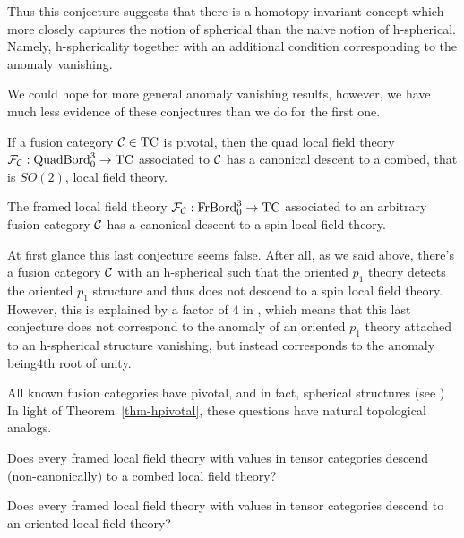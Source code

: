 \documentclass{amsart}
\begin{document}
Thus this conjecture suggests that there is a homotopy invariant concept which more closely captures the notion of spherical than the naive notion of h-spherical.  Namely, h-sphericality together with an additional condition corresponding to the anomaly vanishing.

We could hope for more general anomaly vanishing results, however, we have much less evidence of these conjectures than we do for the first one.

\begin{conjecture}
If a fusion category $\mathcal C \in \mathrm{TC}$ is pivotal, then the quad local field theory $\mathcal F_{\mathcal C} : \mathrm{QuadBord}_0^3 \rightarrow \mathrm{TC}$ associated to $\mathcal C$ has a canonical descent to a combed, that is $SO(2)$, local field theory.
\end{conjecture}

\begin{conjecture}
The framed local field theory $\mathcal F_{\mathcal C} : \mathrm{FrBord}_0^3 \rightarrow \mathrm{TC}$ associated to an arbitrary fusion category $\mathcal C$ has a canonical descent to a spin local field theory.
\end{conjecture}

\begin{warning}
At first glance this last conjecture seems false.  After all, as we said above, there's a fusion category $\mathcal C$ with an h-spherical such that the oriented $p_1$ theory detects the oriented $p_1$ structure and thus does not descend to a spin local field theory.  However, this is explained by a factor of $4$ in , which means that this last conjecture does not correspond to the anomaly of an oriented $p_1$ theory attached to an h-spherical structure vanishing, but instead corresponds to the anomaly being$4$th root of unity.
\end{warning}

All known fusion categories have pivotal, and in fact, spherical structures (see \cite[Conjecture ???]{???}) In light of Theorem~\ref{thm-hpivotal}, these questions have natural topological analogs.

\begin{question}
Does every framed local field theory with values in tensor categories descend (non-canonically) to a combed local field theory?
\end{question}

\begin{question}
Does every framed local field theory with values in tensor categories descend to an oriented local field theory?
\end{question}
\end{document}
